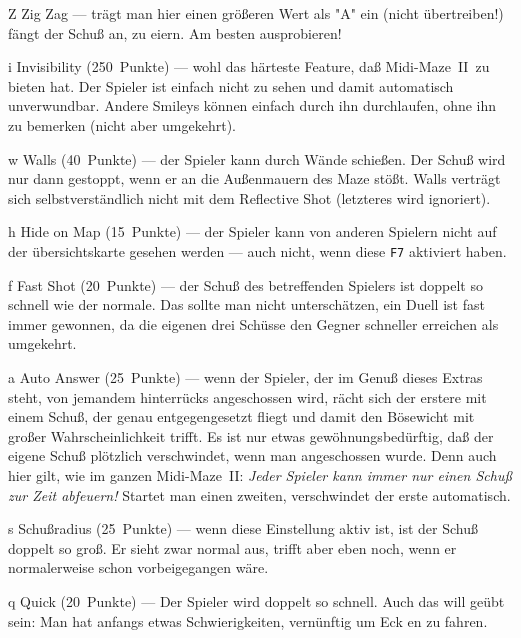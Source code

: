 \documentclass[12pt,twoside]{article}
\newcommand{\mmI}{{\sc Midi-Maze}}
\newcommand{\mm}{\mmI~{\sc II}}
\newcommand{\deflabel}[1]{\bf #1\hfill}%
\newenvironment{deflist}[1]%
{\begin{list}{}%
{\settowidth{\labelwidth}{\bf #1}%
\setlength{\leftmargin}{\labelwidth}%
\addtolength{\leftmargin}{\labelsep}%
\renewcommand{\makelabel}{\deflabel}}}%
{\end{list}}%
\begin{document}
\begin{deflist}{Win}
\item[Z] Zig Zag --- tr\"agt man hier einen gr\"o\ss{}eren Wert als "A" ein (nicht 
\"uber\-trei\-ben!) f\"angt der Schu\ss{} an, zu eiern. Am besten ausprobieren!


\item[i] Invisibility (250~Punkte) --- wohl das h\"arteste Feature, da\ss{} \mm\ 
zu bieten hat. Der Spieler ist einfach nicht zu sehen und damit automatisch 
unverwundbar. Andere Smileys k\"onnen einfach durch ihn durchlaufen, ohne ihn 
zu bemerken (nicht aber umgekehrt).


\item[w] Walls (40~Punkte) --- der Spieler kann durch W\"ande schie\ss{}en. Der 
Schu\ss{} wird nur dann gestoppt, wenn er an die Au\ss{}enmauern des Maze st\"o\ss{}t. 
Walls vertr\"agt sich selbstverst\"andlich nicht mit dem Reflective Shot 
(letzteres wird ignoriert).


\item[h] Hide on Map (15~Punkte) --- der Spieler kann von anderen Spielern 
nicht auf der \"ubersichtskarte gesehen werden --- auch nicht, wenn diese 
\verb|F7| aktiviert haben.


\item[f] Fast Shot (20~Punkte) --- der Schu\ss{} des betreffenden Spielers ist 
doppelt so schnell wie der normale. Das sollte man nicht untersch\"atzen, ein 
Duell ist fast immer gewonnen, da die eigenen drei Sch\"usse den Gegner 
schneller erreichen als umgekehrt.


\item[a] Auto Answer (25~Punkte) --- wenn der Spieler, der im Genu\ss{} dieses 
Extras steht, von jemandem hinterr\"ucks angeschossen wird, r\"acht sich der 
erstere mit einem Schu\ss{}, der genau entgegengesetzt fliegt und damit den 
B\"osewicht mit gro\ss{}er Wahrscheinlichkeit trifft. Es ist nur etwas 
gew\"ohnungsbed\"urftig, da\ss{} der eigene Schu\ss{} pl\"otzlich verschwindet, wenn man 
angeschossen wurde. Denn auch hier gilt, wie im ganzen \mm: {\em Jeder 
Spieler kann immer nur einen Schu\ss{} zur Zeit abfeuern!\/} Startet man einen 
zweiten, verschwindet der erste automatisch.


\item[s] Schu\ss{}radius (25~Punkte) --- wenn diese Einstellung aktiv ist, ist 
der Schu\ss{} doppelt so gro\ss{}. Er sieht zwar normal aus, trifft aber eben noch, 
wenn er normalerweise schon vorbeigegangen w\"are.


\item[q] Quick (20~Punkte) --- Der Spieler wird doppelt so schnell. Auch das 
will ge\"ubt sein: Man hat anfangs etwas Schwierigkeiten, vern\"unftig um Eck 
en zu fahren.



\end{deflist}
\end{document}
